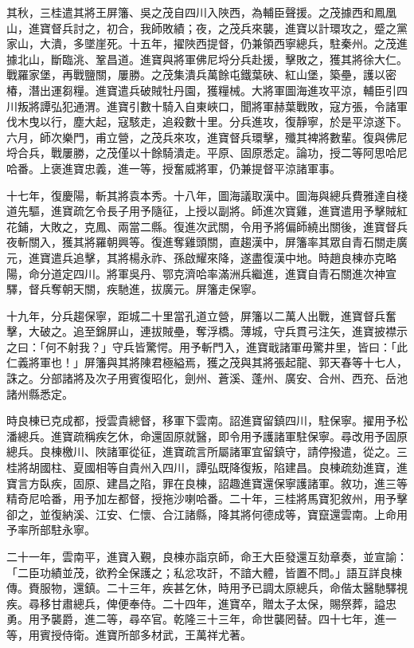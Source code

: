 \begin{pinyinscope}
其秋，三桂遣其將王屏籓、吳之茂自四川入陜西，為輔臣聲援。之茂據西和鳳凰山，進寶督兵討之，初合，我師敗績；夜，之茂兵來襲，進寶以計環攻之，蹙之黨家山，大潰，多墜崖死。十五年，擢陜西提督，仍兼領西寧總兵，駐秦州。之茂進據北山，斷臨洮、鞏昌道。進寶與將軍佛尼埒分兵赴援，擊敗之，獲其將徐大仁。戰羅家堡，再戰鹽關，屢勝。之茂集潰兵萬餘屯鐵葉硤、紅山堡，築壘，護以密椿，潛出運芻糧。進寶遣兵破賊牡丹園，獲糧械。大將軍圖海進攻平涼，輔臣引四川叛將譚弘犯通渭。進寶引數十騎入自東峽口，聞將軍赫葉戰敗，寇方張，令諸軍伐木曳以行，塵大起，寇駭走，追殺數十里。分兵進攻，復靜寧，於是平涼遂下。六月，師次樂門，甫立營，之茂兵來攻，進寶督兵環擊，殲其裨將數輩。復與佛尼埒合兵，戰屢勝，之茂僅以十餘騎潰走。平原、固原悉定。論功，授二等阿思哈尼哈番。上褒進寶忠義，進一等，授奮威將軍，仍兼提督平涼諸軍事。

十七年，復慶陽，斬其將袁本秀。十八年，圖海議取漢中。圖海與總兵費雅達自棧道先驅，進寶疏乞令長子用予隨征，上授以副將。師進次寶雞，進寶遣用予擊賊紅花鋪，大敗之，克鳳、兩當二縣。復進次武關，令用予將偏師繞出關後，進寶督兵夜斬關入，獲其將羅朝興等。復進奪雞頭關，直趨漢中，屏籓率其眾自青石關走廣元，進寶遣兵追擊，其將楊永祚、孫啟耀來降，遂盡復漢中地。時趙良棟亦克略陽，命分道定四川。將軍吳丹、鄂克濟哈率滿洲兵繼進，進寶自青石關進次神宣驛，督兵奪朝天關，疾馳進，拔廣元。屏籓走保寧。

十九年，分兵趨保寧，距城二十里當孔道立營，屏籓以二萬人出戰，進寶督兵奮擊，大破之。追至錦屏山，連拔賊壘，奪浮橋。薄城，守兵貫弓注矢，進寶披襟示之曰：「何不射我？」守兵皆驚愕。用予斬門入，進寶戢諸軍毋驚井里，皆曰：「此仁義將軍也！」屏籓與其將陳君極縊焉，獲之茂與其將張起龍、郭天春等十七人，誅之。分部諸將及次子用賓復昭化，劍州、蒼溪、蓬州、廣安、合州、西充、岳池諸州縣悉定。

時良棟已克成都，授雲貴總督，移軍下雲南。詔進寶留鎮四川，駐保寧。擢用予松潘總兵。進寶疏稱疾乞休，命還固原就醫，即令用予護諸軍駐保寧。尋改用予固原總兵。良棟檄川、陜諸軍從征，進寶疏言所屬諸軍宜留鎮守，請停撥遣，從之。三桂將胡國柱、夏國相等自貴州入四川，譚弘既降復叛，陷建昌。良棟疏劾進寶，進寶言方臥疾，固原、建昌之陷，罪在良棟，詔趣進寶還保寧護諸軍。敘功，進三等精奇尼哈番，用予加左都督，授拖沙喇哈番。二十年，三桂將馬寶犯敘州，用予擊卻之，並復納溪、江安、仁懷、合江諸縣，降其將何德成等，寶竄還雲南。上命用予率所部駐永寧。

二十一年，雲南平，進寶入覲，良棟亦詣京師，命王大臣發還互劾章奏，並宣諭：「二臣功績並茂，欲矜全保護之；私忿攻訐，不諳大體，皆置不問。」語互詳良棟傳。賚服物，還鎮。二十三年，疾甚乞休，時用予已調太原總兵，命偕太醫馳驛視疾。尋移甘肅總兵，俾便奉侍。二十四年，進寶卒，贈太子太保，賜祭葬，謚忠勇。用予襲爵，進二等，尋卒官。乾隆三十三年，命世襲罔替。四十七年，進一等，用賓授侍衛。進寶所部多材武，王萬祥尤著。


\end{pinyinscope}
